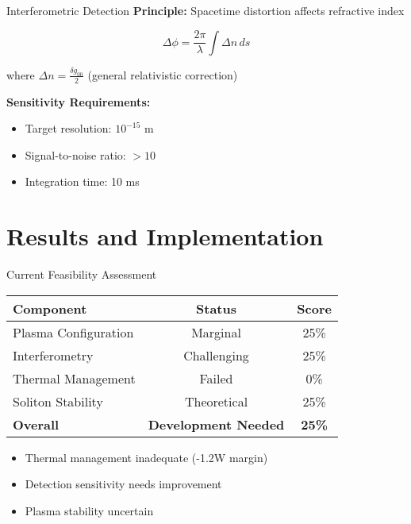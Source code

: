 \begin{frame}{Interferometric Detection}
    \textbf{Principle:} Spacetime distortion affects refractive index
    
    \begin{equation}
        \Delta \phi = \frac{2\pi}{\lambda} \int \Delta n \, ds
    \end{equation}
    
    where $\Delta n = \frac{\delta g_{00}}{2}$ (general relativistic correction)
    
    \vspace{0.3cm}
    \textbf{Sensitivity Requirements:}
    \begin{itemize}
        \item Target resolution: $10^{-15}$ m
        \item Signal-to-noise ratio: $>10$
        \item Integration time: 10 ms
    \end{itemize}
\end{frame}

\section{Results and Implementation}

\begin{frame}{Current Feasibility Assessment}
    \begin{table}
        \centering
        \begin{tabular}{lcc}
            \toprule
            \textbf{Component} & \textbf{Status} & \textbf{Score} \\
            \midrule
            Plasma Configuration & Marginal & 25\% \\
            Interferometry & Challenging & 25\% \\
            Thermal Management & Failed & 0\% \\
            Soliton Stability & Theoretical & 25\% \\
            \midrule
            \textbf{Overall} & \textbf{Development Needed} & \textbf{25\%} \\
            \bottomrule
        \end{tabular}
    \end{table}
    
    \begin{itemize}
        \item Thermal management inadequate (-1.2W margin)
        \item Detection sensitivity needs improvement
        \item Plasma stability uncertain
    \end{itemize}
\end{frame}

